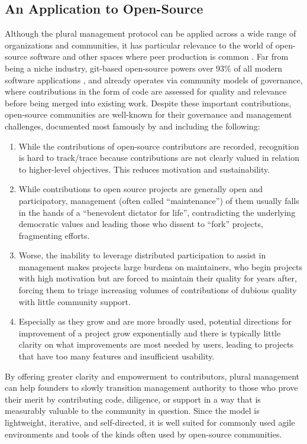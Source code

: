 \documentclass{article}
\begin{document}
\subsection{An Application to Open-Source}
Although the plural management protocol can be applied across a wide range of organizations and communities, it has particular relevance to the world of open-source software and other spaces where peer production is common \cite{benkler2017peer}. Far from being a niche industry, git-based open-source powers over 93\% of all modern software applications \cite{daigle2023octoverse}, and already operates via community models of governance, where contributions in the form of code are assessed for quality and relevance before being merged into existing work. Despite these important contributions, open-source communities are well-known for their governance and management challenges, documented most famously by \cite{eghbal2020working} and including the following:

\begin{enumerate}
    \item While the contributions of open-source contributors are recorded, recognition is hard to track/trace because contributions are not clearly valued in relation to higher-level objectives. This reduces motivation and sustainability.
    \item While contributions to open source projects are generally open and participatory, management (often called ``maintenance'') of them usually falls in the hands of a ``benevolent dictator for life'', contradicting the underlying democratic values and leading those who dissent to ``fork'' projects, fragmenting efforts.
    \item Worse, the inability to leverage distributed participation to assist in management makes projects large burdens on maintainers, who begin projects with high motivation but are forced to maintain their quality for years after, forcing them to triage increasing volumes of contributions of dubious quality with little community support.
    \item Especially as they grow and are more broadly used, potential directions for improvement of a project grow exponentially and there is typically little clarity on what improvements are most needed by users, leading to projects that have too many features and insufficient usability.
\end{enumerate}

By offering greater clarity and empowerment to contributors, plural management can help founders to slowly transition management authority to those who prove their merit by contributing code, diligence, or support in a way that is measurably valuable to the community in question. Since the model is lightweight, iterative, and self-directed, it is well suited for commonly used agile environments and tools of the kinds often used by open-source communities.
\end{document}
